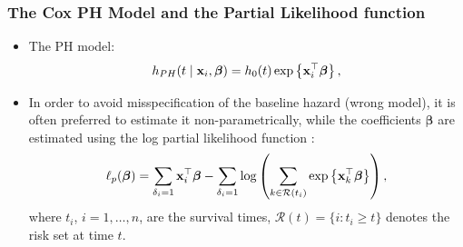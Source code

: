 \documentclass[10pt,handout,compress]{beamer}
\newcommand{\bbeta}{\bm{\beta}}
\newcommand{\bgamma}{\bm{\gamma}}
\newcommand{\bx}{{\bf x}}
\begin{document}
\begin{frame}
\frametitle{The Cox PH Model and the Partial Likelihood function}
\begin{itemize}
\item The PH model:
$$
h_{PH}(t\mid \bx_i, \bbeta) = h_0(t)\exp\left\{\bx_i^{\top}\bbeta \right\},
$$
\pause
\item In order to avoid misspecification of the baseline hazard (wrong model), it is often preferred to estimate it non-parametrically, while the coefficients $\bbeta$ are estimated using the log partial likelihood function \cite{cox:1972}: \pause
$$
\ell_p(\bbeta) = \sum_{\delta_i=1} \bx_i^{\top}\bbeta  - \sum_{\delta_i=1} \log\left( \sum_{k \in {\mathcal R}(t_i)} \exp\left\{\bx_k^{\top}\bbeta\right\}\right),
$$
where $t_i$, $i=1,\dots,n$, are the survival times, ${\mathcal R}(t) = \{i : t_i \geq t\}$ denotes the risk set at time $t$.
\end{itemize}
\end{frame}



\nocite{KP11} \nocite{klein:2016} \nocite{harrell:2015}



\end{document}

